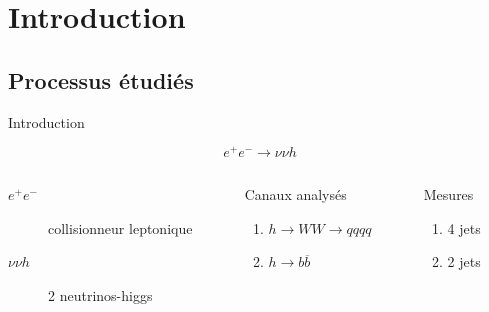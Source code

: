 \documentclass[9pt]{beamer}
\newcommand{\bbar}{\overline{b}}
\begin{document}
\section{Introduction}
\subsection{Processus étudiés}
\begin{frame}{Introduction}

	$$ e^{+} e^{-} \longrightarrow \nu \nu h $$

	\begin{columns}
		
		\begin{column}{0.5\textwidth}
			\begin{description}
				\item[$e^{+} e^{-}$] collisionneur leptonique
				\item[$\nu \nu h$] 2 neutrinos-higgs
			\end{description}
		\end{column}
		
		\begin{column}{0.35\textwidth}
			\begin{block}{Canaux analysés}
				\begin{enumerate}
					\item $h \longrightarrow WW \longrightarrow qqqq$
					\item $h \longrightarrow b\bbar$
				\end{enumerate}
			\end{block}
        \end{column}
		
		\begin{column}{0.15\textwidth}
            \begin{block}{Mesures}
                \begin{enumerate}
                    \item 4 jets
                    \item 2 jets
                \end{enumerate}
            \end{block}
		\end{column}
	\end{columns}
    
\end{frame}

\end{document}
